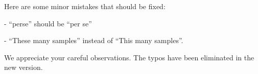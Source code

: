 \begin{reviewer}
Here are some minor mistakes that should be fixed:

\noindent- ``perse'' should be ``per se''

\noindent- ``These many samples'' instead of ``This many samples''.
\end{reviewer}

\begin{authors}
We appreciate your careful observations. The typos have been eliminated in the
new version.

\begin{actions}
\end{actions}
\end{authors}
